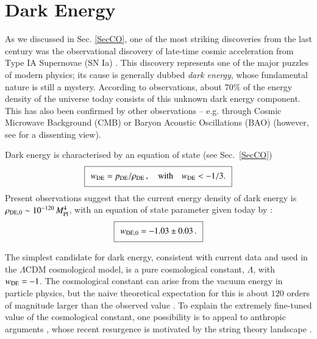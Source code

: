 \section{Dark Energy}
\label{sec:DE}

As we discussed in Sec. \ref{SecCO}, one of the most striking discoveries from the last century was the observational discovery of late-time cosmic acceleration from Type IA Supernovae (SN Ia) \cite{Riess:1998cb,Perlmutter:1998np}. This discovery represents one of the major puzzles of modern physics; its cause is generally dubbed {\em dark energy}, whose fundamental nature is still a mystery. According to observations, about $70\%$ of the energy density of the universe today consists of this unknown dark energy component. This has also been confirmed by other observations -- e.g. through Cosmic Microwave Background (CMB) \cite{WMAP:2003elm,Planck:2018vyg} or Baryon Acoustic Oscillations (BAO) \cite{SDSS:2005xqv} (however, see \cite{Sarkar:2007cx} for a dissenting view). 

Dark energy is characterised by an equation of state (see Sec.~\ref{SecCO})
\begin{equation}
\setlength\fboxsep{0.25cm}
\setlength\fboxrule{0.4pt}
\boxed{
w_{\rm DE} = p_{\rm DE}/\rho_{\rm DE} \,, \quad {\text{with}} \quad w_{\rm DE}< -1/3.
}
\end{equation}
Present observations suggest that the current energy density of dark energy is
$\rho_{{\rm DE}, 0} \sim 10^{-120}\,M_{\rm Pl}^4$, with an equation of state parameter given today by \cite{Planck:2018vyg}:
\begin{equation}
\setlength\fboxsep{0.25cm}
\setlength\fboxrule{0.4pt}
\boxed{
w_{{\rm DE}, 0} = -1.03 \pm 0.03 \,.
}
\end{equation}
 
The simplest candidate for dark energy, consistent with current data and used in the $\Lambda$CDM cosmological model, is a pure cosmological constant, $\Lambda$,  with $w_{\rm DE} =-1$. The cosmological constant can arise from the vacuum energy in particle physics, but the naive theoretical expectation for this is about $120$ orders of magnitude larger than the observed value \cite{Weinberg1}. 
To explain the extremely fine-tuned value of the cosmological constant, one possibility is to appeal to anthropic arguments  \cite{Weinberg2,Garriga:1999bf}, whose recent resurgence is motivated by the string theory landscape \cite{Douglas:2006es}. 

